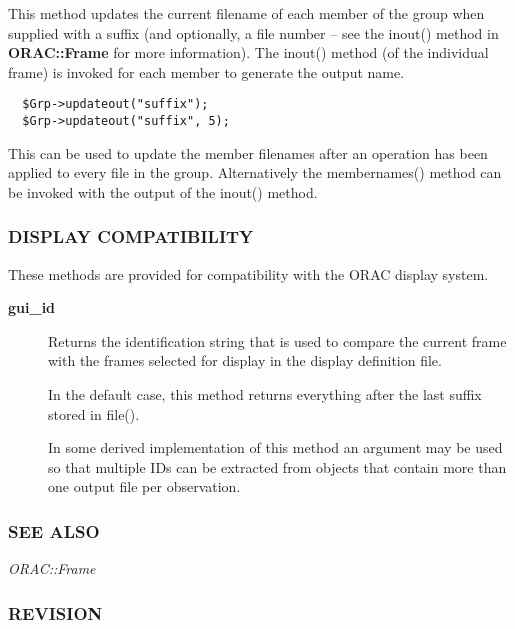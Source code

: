 \begin{description}
This method updates the current filename of each member of the group
when supplied with a suffix (and optionally, a file number -- see the
inout() method in \textbf{ORAC::Frame} for more information). The inout()
method (of the individual frame) is invoked for each member to
generate the output name.

\begin{verbatim}
  $Grp->updateout("suffix");
  $Grp->updateout("suffix", 5);
\end{verbatim}


This can be used to update the member filenames after an operation
has been applied to every file in the group. Alternatively the
membernames() method can be invoked with the output of the inout()
method.

\end{description}
\subsubsection*{DISPLAY COMPATIBILITY\label{ORAC::Group_DISPLAY_COMPATIBILITY}}


These methods are provided for compatibility with the ORAC display
system.

\begin{description}

\item[{\textbf{gui\_id}}] \mbox{}

Returns the identification string that is used to compare the
current frame with the frames selected for display in the
display definition file.



In the default case, this method returns everything after the
last suffix stored in file().



In some derived implementation of this method an argument
may be used so that multiple IDs can be extracted from objects
that contain more than one output file per observation.

\end{description}
\subsubsection*{SEE ALSO\label{ORAC::Group_SEE_ALSO}}


\emph{ORAC::Frame}

\subsubsection*{REVISION\label{ORAC::Group_REVISION}}


